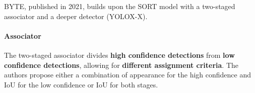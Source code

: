 
{
    \ac{BYTE}\cite{zhang2022bytetrack}, published in 2021, builds upon the SORT model with a two-staged associator and a deeper detector (YOLOX-X\cite{ge2021yolox}).
}

\paragraph{Associator}

{
    The two-staged associator divides \textbf{high confidence detections} from \textbf{low confidence detections}, 
    allowing for \textbf{different assignment criteria}.
    The authors propose either a combination of appearance for the high confidence and \ac{IoU} for the low confidence or \ac{IoU} for both stages.
}
